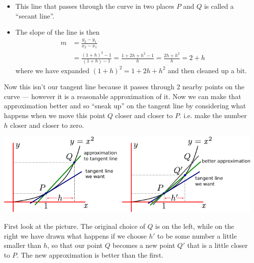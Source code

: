 \begin{itemize}
  \item This line that passes through the curve in two places $P$ and $Q$ is
  called a ``secant line''.

  \item The slope of the line is then
\begin{align*}
  m &= \frac{y_2 - y_1}{x_2-x_1} \\
  &= \frac{(1+h)^2-1}{(1+h)-1}
  =  \frac{1+2h+h^2-1}{h}
  = \frac{2h+h^2}{h}
  = 2+h
\end{align*}
  where we have expanded $(1+h)^2 = 1+2h+h^2$ and then cleaned up a bit.
\end{itemize}
Now this isn't our tangent line because it passes through 2 nearby points on
the curve --- however it is a reasonable approximation of it. Now we can make
that approximation better and so ``sneak up'' on the tangent line by considering
what happens when we move this point $Q$ closer and closer to $P$. i.e. make the
number $h$ closer and closer to zero.
\begin{fig}
\begin{center}
  \includegraphics[width=\textwidth]{tang2a}
\end{center}
\end{fig}

First look at the picture. The original choice of $Q$ is on the left, while on
the right we have drawn what happens if we choose $h'$ to be some number a
little smaller than $h$, so that our point $Q$ becomes a new point $Q'$ that is
a little closer to $P$. The new approximation is better than the first.

